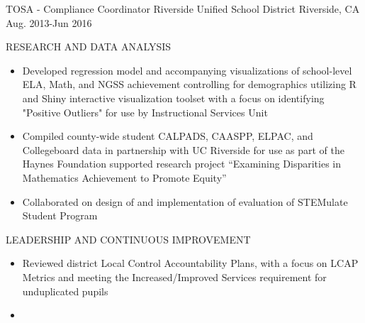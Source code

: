 \begin{cventries}
  \cventry
    {TOSA - Compliance Coordinator} %
    {Riverside Unified School District} %
    {Riverside, CA} %
    {Aug. 2013-Jun 2016} %
    {
      \begin{cvitems} %
          \item RESEARCH AND DATA ANALYSIS
          \begin{itemize}
            \item {Developed regression model and accompanying visualizations of school-level ELA, Math, and NGSS achievement controlling for demographics utilizing R and Shiny interactive visualization toolset with a focus on identifying "Positive Outliers" for use by Instructional Services Unit}
            \item {Compiled county-wide student CALPADS, CAASPP, ELPAC, and Collegeboard data in partnership with UC Riverside for use as part of the Haynes Foundation supported research project “Examining Disparities in Mathematics Achievement to Promote Equity”}
            \item {Collaborated on design of and implementation of evaluation of STEMulate Student Program}
          \end{itemize}
          \item LEADERSHIP AND CONTINUOUS IMPROVEMENT
          \begin{itemize}
            \item {Reviewed district Local Control Accountability Plans, with a focus on LCAP Metrics and meeting the Increased/Improved Services requirement for unduplicated pupils}
            \item {}
          \end{itemize}
      \end{cvitems}
    }
\end{cventries}


